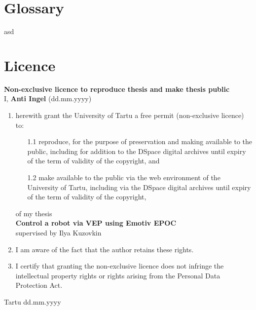 \documentclass[a4paper,12pt]{report}
\begin{document}
\begin{appendices}
\renewcommand{\thechapter}{\Roman{chapter}}
\chapter{Glossary}
asd
\chapter{Licence}
\textbf{Non-exclusive licence to reproduce thesis and make thesis public}\\[1cm]

\noindent I, \textbf{Anti Ingel} (dd.mm.yyyy)

\begin{enumerate}
	\item herewith grant the University of Tartu a free permit (non-exclusive licence) to:
	\begin{enumerate}
		\item[1.1] reproduce, for the purpose of preservation and making available to the public, including for addition to the DSpace digital archives until expiry of the term of validity of the copyright, and
		\item[1.2] make available to the public via the web environment of the University of Tartu, including via the DSpace digital archives until expiry of the term of validity of the copyright,
	\end{enumerate}
	of my thesis\\
	\textbf{Control a robot via VEP using Emotiv EPOC}\\
	supervised by Ilya Kuzovkin
	\item I am aware of the fact that the author retains these rights.
	\item I certify that granting the non-exclusive licence does not infringe the intellectual property rights or rights arising from the Personal Data Protection Act.
\end{enumerate}
\vspace{1cm}
Tartu dd.mm.yyyy


\end{appendices}
\end{document}
